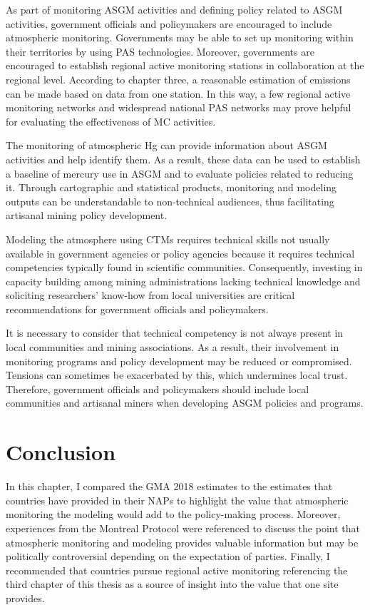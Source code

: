 As part of monitoring ASGM activities and defining policy related to ASGM activities, government officials and policymakers are encouraged to include atmospheric monitoring.  Governments may be able to set up monitoring within their territories by using PAS technologies. Moreover, governments are encouraged to establish regional active monitoring stations in collaboration at the regional level. According to chapter three, a reasonable estimation of emissions can be made based on data from one station. In this way, a few regional active monitoring networks and widespread national PAS networks may prove helpful for evaluating the effectiveness of MC activities.
  
The monitoring of atmospheric Hg can provide information about ASGM activities and help identify them. As a result, these data can be used to establish a baseline of mercury use in ASGM and to evaluate policies related to reducing it. Through cartographic and statistical products, monitoring and modeling outputs can be understandable to non-technical audiences, thus facilitating artisanal mining policy development. 

Modeling the atmosphere using CTMs requires technical skills not usually available in government agencies or policy agencies because it requires technical competencies typically found in scientific communities. Consequently, investing in capacity building among mining administrations lacking technical knowledge and soliciting researchers' know-how from local universities are critical recommendations for government officials and policymakers.  
 
It is necessary to consider that technical competency is not always present in local communities and mining associations. As a result, their involvement in monitoring programs and policy development may be reduced or compromised. Tensions can sometimes be exacerbated by this, which undermines local trust. Therefore, government officials and policymakers should include local communities and artisanal miners when developing ASGM policies and programs. 


\section{Conclusion}
\begin{flushleft}
In this chapter, I compared the GMA 2018 estimates to the estimates that countries have provided in their NAPs to highlight the value that atmospheric monitoring the modeling would add to the policy-making process. Moreover, experiences from the Montreal Protocol were referenced to discuss the point that atmospheric monitoring and modeling provides valuable information but may be politically controversial depending on the expectation of parties. Finally, I recommended that countries pursue regional active monitoring  referencing the third chapter of this thesis as a source of insight into the value that one site provides. 
\end{flushleft}